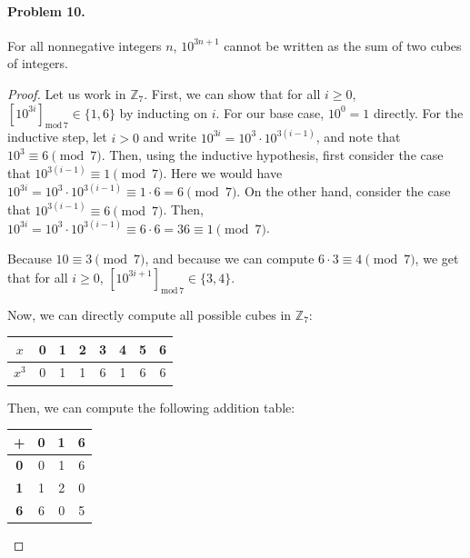 \documentclass[12pt]{article}
\begin{document}
\paragraph{Problem 10.} For all nonnegative integers $n$, $10^{3n + 1}$ cannot be written as the sum of two cubes of integers.

\begin{proof}
Let us work in $\mathbb Z_7$. First, we can show that for all $i \ge 0$, $[10^{3i}]_{\mathrm{mod}\,7} \in \{1, 6\}$ by inducting on $i$. For our base case, $10^0 = 1$ directly. For the inductive step, let $i > 0$ and write $10^{3i} = 10^3 \cdot 10^{3(i-1)}$, and note that $10^3 \equiv 6 \pmod 7$. Then, using the inductive hypothesis, first consider the case that $10^{3(i-1)} \equiv 1 \pmod 7$. Here we would have $10^{3i} = 10^3 \cdot 10^{3(i-1)} \equiv 1 \cdot 6 = 6 \pmod 7$. On the other hand, consider the case that $10^{3(i-1)} \equiv 6 \pmod 7$. Then, $10^{3i} = 10^3 \cdot 10^{3(i-1)} \equiv 6 \cdot 6 = 36 \equiv 1 \pmod 7$.

Because $10 \equiv 3 \pmod 7$, and because we can compute $6 \cdot 3 \equiv 4 \pmod 7$, we get that for all $i \ge0$, $[10^{3i+1}]_{\mathrm{mod}\,7} \in \{3, 4\}$.

Now, we can directly compute all possible cubes in $\mathbb Z_7$:

\begin{table}[H]
    \centering
    \begin{tabular}{|c|c|c|c|c|c|c|c|}
        \hline
        $x$ & 0 & 1 & 2 & 3 & 4 & 5 & 6 \\
        \hline $x^3$ & 0 & 1 & 1 & 6 & 1 & 6 & 6  \\
        \hline
    \end{tabular}
    \label{tab:my_table}
\end{table}

Then, we can compute the following addition table:

\begin{table}[H]
    \centering
    \begin{tabular}{|c|c|c|c|}
        \hline
        + & \bf{0} & \bf 1 & \bf 6 \\ \hline
        \bf 0 & 0 & 1 & 6 \\ \hline
        \bf 1 & 1 & 2 & 0 \\ \hline
        \bf 6 & 6 & 0 & 5 \\ \hline
    \end{tabular}
    \label{tab:my_table2}
\end{table}


\end{proof}
\end{document}
